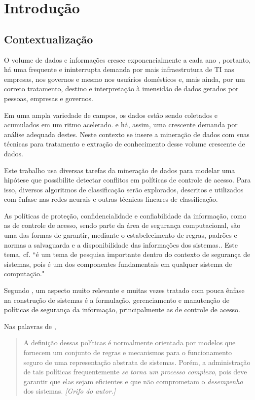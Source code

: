 \chapter{Introdução} \label{introducao}
\section{Contextualização} \label{contextualizacao}
O volume de dados e informações cresce exponencialmente a cada ano \cite{alecrim2019}, portanto, há uma frequente e ininterrupta demanda por mais infraestrutura de TI nas empresas, nos governos e mesmo nos usuários domésticos \cite{machado2014} e, mais ainda, por um correto tratamento, destino e interpretação à imensidão de dados gerados por pessoas, empresas e governos. 

Em uma ampla variedade de campos, os dados estão sendo coletados e acumulados em um ritmo acelerado.\cite{fayyad1996}\cite{lima_fraud_2012} e há, assim, uma crescente demanda por análise adequada destes. Neste contexto se insere a mineração de dados com suas técnicas para tratamento e extração de conhecimento desse volume crescente de dados.\cite{Boscarioli2017}\cite{ferrari2017}

Este trabalho usa diversas tarefas da mineração de dados para modelar uma hipótese que possibilite detectar conflitos em políticas de controle de acesso. Para isso, diversos algoritmos de classificação serão explorados, descritos e utilizados com ênfase nas redes neurais e outras técnicas lineares de classificação.

As políticas de proteção, confidencialidade e confiabilidade da informação, como as de controle de acesso, sendo parte da área de segurança computacional, são uma das formas de garantir, mediante o estabelecimento de regras, padrões e normas a salvaguarda e a disponibilidade das informações dos sistemas.\cite{sarkis2017}\cite{bui_efficient_2019}. Este tema, cf. \cite[p.1]{ueda_tese_2012} ``é um tema de pesquisa importante dentro do contexto de segurança de sistemas, pois é um dos componentes fundamentais em qualquer sistema de computação."

Segundo \cite{li_security_2006}, um aspecto muito relevante e muitas vezes tratado com pouca ênfase na construção de sistemas é a formulação, gerenciamento e manutenção de políticas de segurança da informação, principalmente as de controle de acesso. 

Nas palavras de \cite[p.1]{ueda_tese_2012},
\begin{quotation}
	A definição dessas políticas é normalmente orientada por modelos que fornecem um conjunto de regras e mecanismos para o funcionamento seguro de uma representação abstrata de sistemas. Porém, a administração de tais políticas frequentemente \textit{se torna um processo complexo}, pois deve garantir que elas sejam eficientes e que não comprometam o \textit{desempenho} dos sistemas. \emph{[Grifo do autor.]}
\end{quotation}

